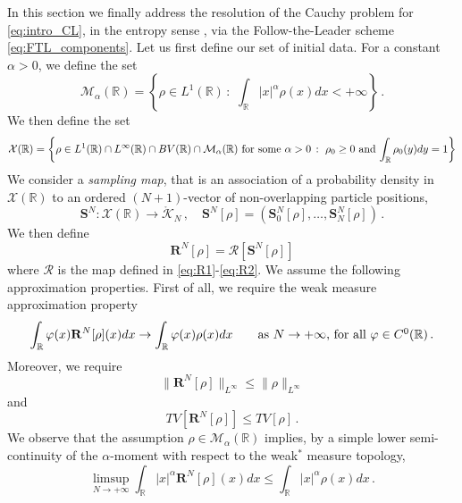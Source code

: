 \documentclass[reqno,oneside]{amsart}
\theoremstyle{plain}
\newcommand{\R}{\mathbb{R}}
\newcommand{\sam}{\mathbf{S}}
\begin{document}
In this section we finally address the resolution of the Cauchy problem for \eqref{eq:intro_CL}, in the entropy sense \cite{kruzkov}, via the Follow-the-Leader scheme \ref{eq:FTL_components}. Let us first define our set of initial data.
For a constant $\alpha>0$, we define the set
\[\mathcal{M}_\alpha(\R)=\left\{\rho\in L^1(\R)\,:\,\, \int_\R|x|^\alpha \rho(x) dx <+\infty\right\}\,.\]
We then define the set
\[
\displaystyle{\mathcal{X}(\R)=\left\{\rho\in L^1(\R)\cap L^\infty(\R)\cap BV(\R)\cap \mathcal{M}_\alpha(\R)\ \hbox{for some $\alpha>0$}\,:\,\, \hbox{$\rho_0\geq 0$ and $\displaystyle{\int_\R\rho_0(y)dy = 1}$}\right\}}
\]
We consider a  \emph{sampling map}, that is an association of a probability density in $\mathcal{X}(\R)$ 
to an ordered $(N+1)$-vector of non-overlapping particle positions,
\begin{equation}\label{eq:initial_sampling_2}
  \sam^N:\mathcal{X}(\R)\rightarrow \mathring{\mathcal{K}}_N\,,\quad \sam^N[\rho]=\left(\sam^N_0[\rho],\ldots,\sam^N_N[\rho]\right)\,.
\end{equation}
We then define 
\[\mathbf{R}^N[\rho]=\mathcal{R}[\sam^N[\rho]]\]
where $\mathcal{R}$ is the map defined in \eqref{eq:R1}-\eqref{eq:R2}. 
We assume the following approximation properties. First of all, we require the weak measure approximation property
\begin{equation}\label{eq:initial_sampling}
  \int_\R \varphi(x)\mathbf{R}^N[\rho](x)dx\rightarrow \int_\R \varphi(x)\rho(x) dx\qquad \hbox{as $N\rightarrow+\infty$, for all $\varphi\in C^0(\R)$}\,.
\end{equation}
Moreover, we require
\begin{equation}\label{eq:approx_contraction_1}
    \|\mathbf{R}^N[\rho]\|_{L^\infty}\leq \|\rho\|_{L^\infty}
\end{equation}
and
\begin{equation}\label{eq:approx_contraction_2}
    TV[\mathbf{R}^N[\rho]]\leq TV[\rho]\,.
\end{equation}
We observe that the assumption $\rho\in \mathcal{M}_\alpha(\R)$ implies, by a simple lower semi-continuity of the $\alpha$-moment with respect to the weak$^*$ measure topology, 
\begin{equation}\label{eq:sampling_moment}
\limsup_{N\rightarrow+\infty}\int_\R|x|^\alpha \mathbf{R}^N[\rho](x) dx\leq \int_\R|x|^\alpha \rho(x) dx\,.
\end{equation}
\end{document}
